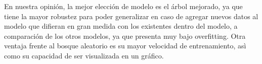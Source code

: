 \documentclass[a4paper]{article}
\begin{document}
    En nuestra opinión, la mejor elección de modelo es el árbol mejorado, ya que tiene la mayor robustez  para poder generalizar en caso de agregar nuevos datos al modelo que difieran en gran medida con los existentes dentro del modelo, a comparación de los otros modelos, ya que presenta muy bajo overfitting. Otra ventaja frente al bosque aleatorio es su mayor velocidad de entrenamiento, asì como su capacidad de ser visualizada en un gráfico.
    
\end{document}
